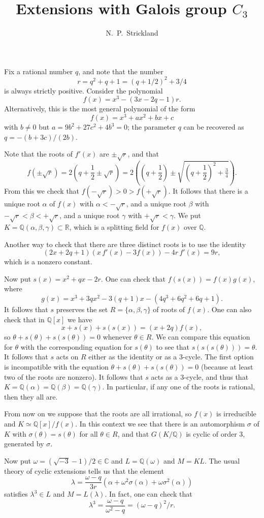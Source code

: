 \documentclass{amsart}
\newcommand{\C}         {{\mathbb{C}}}
\newcommand{\Q}         {{\mathbb{Q}}}
\newcommand{\R}         {{\mathbb{R}}}
\newcommand{\al}        {\alpha}
\newcommand{\bt}        {\beta}
\newcommand{\gm}        {\gamma}
\newcommand{\half}      {{\textstyle\frac{1}{2}}}
\newcommand{\lm}        {\lambda}
\newcommand{\om}        {\omega}
\newcommand{\sg}        {\sigma}
\newcommand{\tht}       {\theta}
\renewcommand{\:}{\colon}
\theoremstyle{definition}
\begin{document}
\title{Extensions with Galois group $C_3$}
\author{N.~P.~Strickland}

\maketitle 

Fix a rational number $q$, and note that the number 
\[ r=q^2+q+1 = (q+1/2)^2+3/4 \] 
is always strictly positive.  Consider the polynomial
\[ f(x) = x^3 - (3x-2q-1)r. \]
Alternatively, this is the most general polynomial of the form
\[ f(x) = x^3 + ax^2 + bx + c \] 
with $b\neq 0$ but $a=9b^2+27c^2+4b^3=0$; the parameter $q$ can be
recovered as $q=-(b+3c)/(2b)$.

Note that the roots of $f'(x)$ are $\pm\sqrt{r}$, and that
\[ f(\pm\sqrt{r})=2(q+\half\pm\sqrt{r}) = 
     2\left((q+\half) \pm
              \sqrt{(q+\half)^2+\tfrac{3}{4}}\right). 
\] 
From this we check that $f(-\sqrt{r})>0>f(+\sqrt{r})$.  It follows
that there is a unique root $\al$ of $f(x)$ with $\al<-\sqrt{r}$, and
a unique root $\bt$ with $-\sqrt{r}<\bt<+\sqrt{r}$, and a unique root
$\gm$ with $+\sqrt{r}<\gm$.  We put $K=\Q(\al,\bt,\gm)\subset\R$,
which is a splitting field for $f(x)$ over $\Q$.
 
Another way to check that there are three distinct roots is to use the
identity 
\[ (2x+2q+1)(x\,f'(x)-3f(x)) - 4r\,f'(x) = 9r, \]
which is a nonzero constant.

Now put $s(x)=x^2+qx-2r$.  One can check that
$f(s(x))=f(x)g(x)$, where
\[ g(x) = x^3+3qx^2-3(q+1)x-(4q^3+6q^2+6q+1). \]
It follows that $s$ preserves the set $R=\{\al,\bt,\gm\}$ of roots of
$f(x)$.  One can also check that in $\Q[x]$ we have
\[ x+s(x)+s(s(x)) = (x+2q)f(x), \]
so $\tht+s(\tht)+s(s(\tht))=0$ whenever $\tht\in R$.  We can compare
this equation for $\tht$ with the corresponding equation for $s(\tht)$
to see that $s(s(s(\tht)))=\tht$.  It follows that $s$ acts on $R$
either as the identity or as a $3$-cycle.  The first option is
incompatible with the equation $\tht+s(\tht)+s(s(\tht))=0$ (because at
least two of the roots are nonzero).  It follows that $s$ acts as a
$3$-cycle, and thus that $K=\Q(\al)=\Q(\bt)=\Q(\gm)$.  In particular,
if any one of the roots is rational, then they all are.

From now on we suppose that the roots are all irrational, so $f(x)$ is
irreducible and $K\simeq\Q[x]/f(x)$.  In this context we see that
there is an automorphism $\sg$ of $K$ with $\sg(\tht)=s(\tht)$ for all
$\tht\in R$, and that $G(K/\Q)$ is cyclic of order $3$, generated by
$\sg$.  

Now put $\om=(\sqrt{-3}-1)/2\in\C$ and $L=\Q(\om)$ and $M=KL$.  The
usual theory of cyclic extensions tells us that the element
\[ \lm = \frac{\om-q}{3r}(\al + \om^2\sg(\al) + \om\sg^2(\al)) \]
satisfies $\lm^3\in L$ and $M=L(\lm)$.   In fact, one can check that
\[ \lm^3 = \frac{\om-q}{\om^2-q} = (\om-q)^2/r . \]


\begin{bibdiv}
\begin{biblist}
\end{biblist}
\end{bibdiv}
\end{document}

